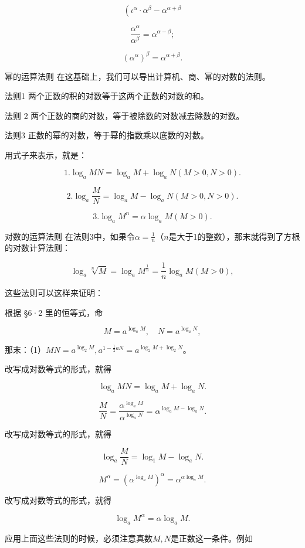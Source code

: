 \[
\left(\iota^{\alpha} \cdot \alpha^{\beta} - \alpha^{\alpha + \beta} \right.
\]

\[
\frac{\alpha^{\alpha}}{\alpha^{\beta}} = \alpha^{\alpha - \beta};
\]

\[
\left(\alpha^{\alpha}\right)^{\beta} = \alpha^{\alpha + \beta}.
\]

幂的运算法则 在这基础上，我们可以导出计算机、商、幂的对数的法则。

法则1 两个正数的积的对数等于这两个正数的对数的和。

法则 2 两个正数的商的对数，等于被除数的对数减去除数的对数。

法则3 正数的幂的对数，等于幂的指数乘以底数的对数。

用式子来表示，就是：

\[
1. \log_{a} M N = \log_{a} M + \log_{a} N (M > 0, N > 0).
\]

\[
2. \log_{a} \frac{M}{N} = \log_{a} M - \log_{a} N (M > 0, N > 0).
\]

\[
3. \log_{a} M^{n} = \alpha \log_{a} M (M > 0).
\]

对数的运算法则
在法则3中，如果令\(\alpha = \frac{1}{n}\)（\(n\)是大于1的整数），那末就得到了方根的对数计算法则：

\[
\log_{a} \sqrt[n]{M} = \log_{a} M^{\frac{1}{n}} = \frac{1}{n} \log_{a} M (M > 0),
\]

这些法则可以这样来证明：

根据 §6·2 里的恒等式，命

\[
M = a^{\log_{a} M}, \quad N = a^{\log_{a} N},
\]

那末：（1）\(MN = a^{\log_2 M}, a^{1 - \frac{1}{2} a N} = a^{\log_2 M + \log_2 N}\)。

改写成对数等式的形式，就得

\[
\log_{a} M N = \log_{a} M + \log_{a} N.
\]

\[
\frac{M}{N} = \frac{\alpha^{\log_{a} M}}{\alpha^{\log_{a} N}} = \alpha^{\log_{a} M - \log_{a} N}. \tag {2}
\]

改写成对数等式的形式，就得

\[
\log_{a} \frac{M}{N} = \log_{1} M - \log_{a} N.
\]

\[
M^{\alpha} = \left(\alpha^{\log_{a} M}\right)^{\alpha} = \alpha^{\alpha \log_{a} M}. \tag {3}
\]

改写成对数等式的形式，就得

\[
\log_{a} M^{\alpha} = \alpha \log_{a} M.
\]

应用上面这些法则的时候，必须注意真数\(M, N\)是正数这一条件。例如

